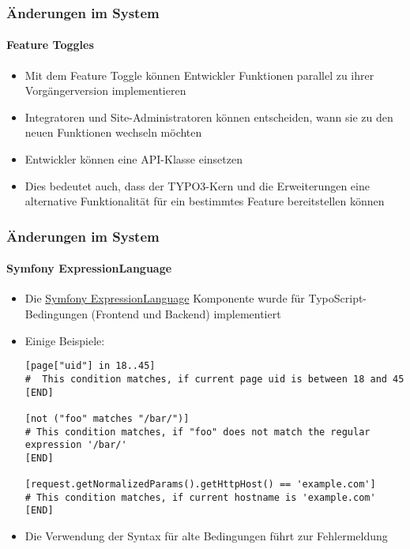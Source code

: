 
\begin{frame}[fragile]
	\frametitle{Änderungen im System}
	\framesubtitle{Feature Toggles}

	\begin{itemize}
		\item Mit dem Feature Toggle können Entwickler Funktionen parallel zu ihrer
			Vorgängerversion implementieren
		\item Integratoren und Site-Administratoren können entscheiden, wann sie zu den
			neuen Funktionen wechseln möchten
		\item Entwickler können eine API-Klasse einsetzen
		\item Dies bedeutet auch, dass der TYPO3-Kern und die Erweiterungen eine alternative
			Funktionalität für ein bestimmtes Feature bereitstellen können
	\end{itemize}

\end{frame}


\begin{frame}[fragile]
	\frametitle{Änderungen im System}
	\framesubtitle{Symfony ExpressionLanguage}

	\lstset{basicstyle=\tiny\ttfamily}

	\begin{itemize}
		\item Die \href{https://symfony.com/doc/current/components/expression_language/syntax.html}{Symfony ExpressionLanguage}
			Komponente wurde für TypoScript-Bedingungen (Frontend
			und Backend) implementiert
		\item Einige Beispiele:

\begin{lstlisting}
[page["uid"] in 18..45]
#  This condition matches, if current page uid is between 18 and 45
[END]

[not ("foo" matches "/bar/")]
# This condition matches, if "foo" does not match the regular expression '/bar/'
[END]

[request.getNormalizedParams().getHttpHost() == 'example.com']
# This condition matches, if current hostname is 'example.com'
[END]
\end{lstlisting}

		\item Die Verwendung der Syntax für alte Bedingungen führt zur Fehlermeldung
	\end{itemize}

\end{frame}

